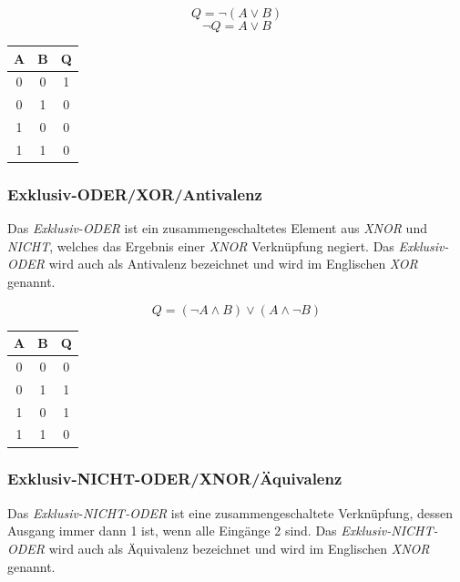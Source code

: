\documentclass[a4paper, 12pt]{report}
\begin{document}
\begin{multicols}{2}
\begin{center}
	\begin{equation}
		Q = \neg(A \lor B)
	\end{equation}
	\begin{equation}
		\neg Q = A \lor B
	\end{equation}
   \begin{tabular}{ | c | c || c | }
    	\hline
    	A & B & Q \\ \hline
    	0 & 0 & 1 \\ \hline
    	0 & 1 & 0 \\ \hline
    	1 & 0 & 0 \\ \hline
    	1 & 1 & 0 \\
    	\hline
    \end{tabular}
\end{center}

\subsubsection{Exklusiv-ODER/XOR/Antivalenz}

Das \emph{Exklusiv-ODER} ist ein zusammengeschaltetes Element aus \emph{XNOR}
und \emph{NICHT}, welches das Ergebnis einer \emph{XNOR} Verknüpfung negiert.
Das \emph{Exklusiv-ODER} wird auch als Antivalenz bezeichnet und wird im
Englischen \emph{XOR} genannt.

\begin{center}
	\begin{equation}
		Q = (\neg A \land B) \lor (A \land \neg B)
	\end{equation}
   \begin{tabular}{ | c | c || c | }
    	\hline
    	A & B & Q \\ \hline
    	0 & 0 & 0 \\ \hline
    	0 & 1 & 1 \\ \hline
    	1 & 0 & 1 \\ \hline
    	1 & 1 & 0 \\
    	\hline
    \end{tabular}
\end{center}

\subsubsection{Exklusiv-NICHT-ODER/XNOR/Äquivalenz}

Das \emph{Exklusiv-NICHT-ODER} ist eine zusammengeschaltete Verknüpfung, dessen
Ausgang immer dann 1 ist, wenn alle Eingänge 2 sind. Das
\emph{Exklusiv-NICHT-ODER} wird auch als Äquivalenz bezeichnet und wird im
Englischen \emph{XNOR} genannt.


\end{multicols}
\end{document}
